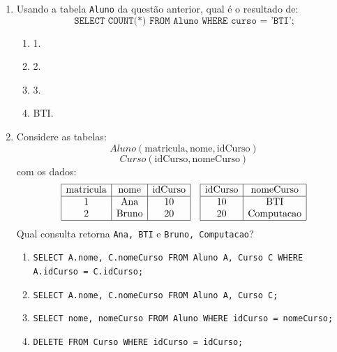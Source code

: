 \documentclass[12pt,a4paper]{article}
\begin{document}
\begin{enumerate}[resume,label=\textbf{Q\arabic*.}]
\begin{enumerate}[label=\alph*)]
    \item Ana e Carla.
    \item Bruno apenas.
    \item BTI e Computacao.
    \item Nenhuma linha.
\end{enumerate}

\item Usando a tabela \texttt{Aluno} da questão anterior, qual é o resultado de:
\[
\texttt{SELECT COUNT(*) FROM Aluno WHERE curso = 'BTI';}
\]

\begin{enumerate}[label=\alph*)]
    \item 1.
    \item 2.
    \item 3.
    \item BTI.
\end{enumerate}

\item Considere as tabelas:
\[
Aluno(\text{matricula}, \text{nome}, \text{idCurso})
\]
\[
Curso(\text{idCurso}, \text{nomeCurso})
\]
com os dados:
\[
\begin{array}{|c|c|c|}
\hline
\text{matricula} & \text{nome} & \text{idCurso}\\
\hline
1 & \text{Ana} & 10\\
2 & \text{Bruno} & 20\\
\hline
\end{array}
\quad
\begin{array}{|c|c|}
\hline
\text{idCurso} & \text{nomeCurso}\\
\hline
10 & \text{BTI}\\
20 & \text{Computacao}\\
\hline
\end{array}
\]
Qual consulta retorna \texttt{Ana, BTI} e \texttt{Bruno, Computacao}?

\begin{enumerate}[label=\alph*)]
    \item \texttt{SELECT A.nome, C.nomeCurso FROM Aluno A, Curso C WHERE A.idCurso = C.idCurso;}
    \item \texttt{SELECT A.nome, C.nomeCurso FROM Aluno A, Curso C;}
    \item \texttt{SELECT nome, nomeCurso FROM Aluno WHERE idCurso = nomeCurso;}
    \item \texttt{DELETE FROM Curso WHERE idCurso = idCurso;}
\end{enumerate}


\end{enumerate}
\end{document}
